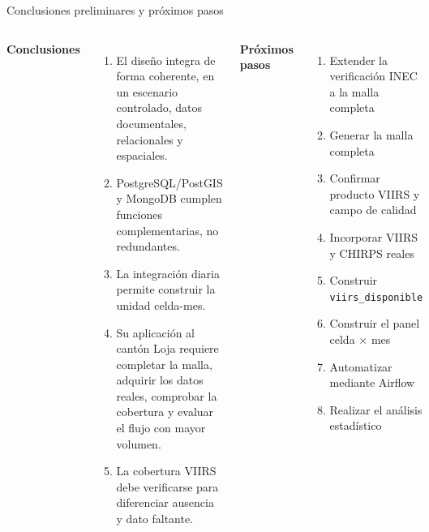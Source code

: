 \documentclass[aspectratio=169,11pt]{beamer}
\newcommand{\seccionactual}{Presentaci\'on}
\begin{document}
\renewcommand{\seccionactual}{V. Conclusiones}
\begin{frame}{Conclusiones preliminares y pr\'oximos pasos}
  \begin{columns}[T]
      \textbf{\color{VerdeOscuro}\small Conclusiones}
      \begin{enumerate}\scriptsize
        \item El dise\~no integra de forma coherente, en un escenario controlado, datos documentales, relacionales y espaciales.
        \item PostgreSQL/PostGIS y MongoDB cumplen funciones complementarias, no redundantes.
        \item La integraci\'on diaria permite construir la unidad celda-mes.
        \item Su aplicaci\'on al cant\'on Loja requiere completar la malla, adquirir los datos reales, comprobar la cobertura y evaluar el flujo con mayor volumen.
        \item La cobertura VIIRS debe verificarse para diferenciar ausencia y dato faltante.
      \end{enumerate}
      \textbf{\color{Tierra}\small Pr\'oximos pasos}
      \begin{enumerate}\scriptsize
        \item Extender la verificaci\'on INEC a la malla completa
        \item Generar la malla completa
        \item Confirmar producto VIIRS y campo de calidad
        \item Incorporar VIIRS y CHIRPS reales
        \item Construir \texttt{viirs\_disponible}
        \item Construir el panel celda $\times$ mes
        \item Automatizar mediante Airflow
        \item Realizar el an\'alisis estad\'istico
      \end{enumerate}
  \end{columns}
\end{frame}

\renewcommand{\seccionactual}{Referencias}
\end{document}
